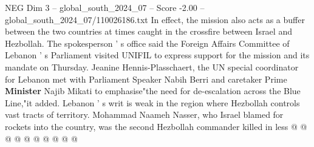 \begin{textsample}{NEG Dim 3 – global\_south\_2024\_07 – Score -2.00 – global\_south\_2024\_07/110026186.txt}
In effect, the mission also acts as a buffer between the two countries at times caught in the crossfire between Israel and Hezbollah.
The spokesperson ' s office said the Foreign Affairs Committee of Lebanon ' s Parliament visited UNIFIL to express support for the mission and its mandate on Thursday.
Jeanine Hennis-Plasschaert, the UN special coordinator for Lebanon met with Parliament Speaker Nabih Berri and caretaker Prime \textbf{Minister} Najib Mikati to emphasise"the need for de-escalation across the Blue Line,"it added.
Lebanon ' s writ is weak in the region where Hezbollah controls vast tracts of territory.
Mohammad Naameh Nasser, who Israel blamed for rockets into the country, was the second Hezbollah commander killed in less @ @ @ @ @ @ @ @ @ @

\end{textsample}
